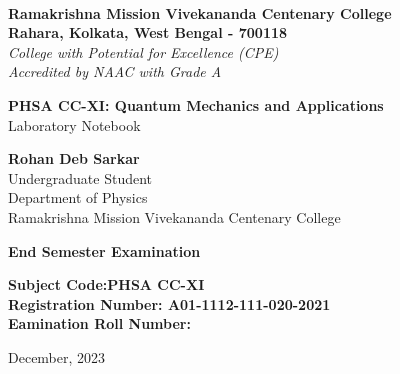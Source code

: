 \begin{titlepage}
    \begin{center}
        \\
        \large\textbf{Ramakrishna Mission Vivekananda Centenary College}\\
        \normalsize\textbf{Rahara, Kolkata, West Bengal - 700118}\\
        \small\slshape College with Potential for Excellence (CPE)\\
        \small\normalfont Accredited by NAAC with Grade A

        \vfill

        \large\textbf{PHSA CC-XI: Quantum Mechanics and Applications}\\
        \normalsize Laboratory Notebook

        \vfill

        \large\textbf{Rohan Deb Sarkar}\\
        \normalsize Undergraduate Student\\
        \normalsize Department of Physics\\
        \normalsize Ramakrishna Mission Vivekananda Centenary College

        \vfill

        \large \textbf{End Semester Examination}\\

        \vspace{2em}

        \normalsize
        \textbf{Subject Code:\hfill PHSA CC-XI\\
                Registration Number: \hfill A01-1112-111-020-2021\\
                Eamination Roll Number: \hfill \\
        }
        
        \vfill

        \normalsize December, 2023
    \end{center}
\end{titlepage}